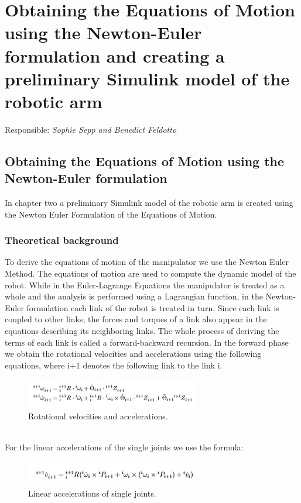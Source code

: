 \chapter{Obtaining the Equations of Motion using the Newton-Euler formulation and 
creating a preliminary Simulink model of the robotic arm}\label{chapter:1}
\vspace{-0.25cm}
Responsible: \textit{Sophie Sepp and Benedict Feldotto}

\section{Obtaining the Equations of Motion using the Newton-Euler formulation}
In chapter two a preliminary Simulink model of the robotic arm is created using the Newton Euler Formulation of the Equations of Motion. 



\subsection{Theoretical background}
To derive the equations of motion of the manipulator we use the Newton Euler Method. The equations of motion are used to compute the dynamic model of the robot. While in the Euler-Lagrange Equations the manipulator is treated as a whole and the analysis is performed using a Lagrangian function, in the Newton-Euler formulation each link of the robot is treated in turn.  Since each link is coupled to other links, the forces and torques of a link also appear in the equations describing its neighboring links. The whole process of deriving the terms of each link is called a forward-backward recursion.
In the forward phase we obtain the rotational velocities and accelerations using the following equations, where i+1 denotes the following link to the link i.


\begin{figure}[htsb]
  \centering
  \includegraphics{figures/Rotational velocities and accelerations.jpg}
  \caption{Rotational velocities and accelerations.}
\end{figure}

\\For the linear accelerations of the single joints we use the formula:
\ \\
\begin{figure}
  \centering
  \includegraphics{figures/Linear accelerations of single joints.jpg}
  \caption{Linear accelerations of single joints.}
\end{figure}





